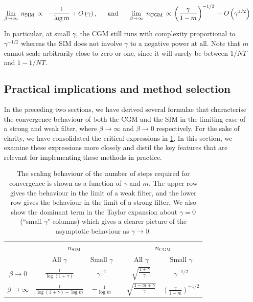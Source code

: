 \begin{equation*}
    \lim_{\beta \rightarrow \infty} \;  n_\text{SIM} \, \propto \;\;  -\frac{1}{\log m} + O\left(\gamma\right), \;\; \quad \text{and} \quad \;\; \lim_{\beta \rightarrow \infty} \;  n_\text{CGM} \, \propto \, \left(\frac{\gamma}{1 - m} \right)^{-1/2} \, + O\left(\gamma^{1/2}\right) 
\end{equation*}


In particular, at small $\gamma$, the CGM still runs with complexity proportional to $\gamma^{-1/2}$ whereas the SIM does not involve $\gamma$ to a negative power at all. Note that $m$ cannot scale arbitrarily close to zero or one, since it will surely be between $1/NT$ and $1 - 1/NT$. 


\subsection{Practical implications and method selection}

\label{sec:GSR_convergence_implications}

In the preceding two sections, we have derived several formulae that characterise the convergence behaviour of both the CGM and the SIM in the limiting case of a strong and weak filter, where $\beta \rightarrow \infty$ and $\beta \rightarrow 0$ respectively. For the sake of clarity, we have consolidated the critical expressions in \cref{tab:conv_SIM_CGM}. In this section, we examine these expressions more closely and distil the key features that are relevant for implementing these methods in practice.


\begin{table}[t]
    \centering
    \def\arraystretch{1.5}
    \begin{tabular}{@{}cccccc}
    \toprule
    & \multicolumn{2}{c}{$n_\text{SIM}$} & \phantom{abc}& \multicolumn{2}{c}{$n_\text{CGM}$} \\
    \cmidrule{2-3} \cmidrule{5-6}
                               & All $\gamma$   & Small $\gamma$   &&  All $\gamma$   & Small $\gamma$ \\ \midrule \rule{0pt}{1cm}
    $\beta \rightarrow 0$      & $ \displaystyle \frac{1}{\log(1 + \gamma)}$   & $\displaystyle \gamma^{-1}$    &&    $\displaystyle \sqrt{\frac{1 + \gamma}{\gamma}}$ & $\displaystyle \gamma^{-1/2}$    \\ \rule{0pt}{6ex}
    $\beta \rightarrow \infty$ & $\displaystyle \frac{1}{\log(1 + \gamma) - \log m}$ & $\displaystyle -\frac{1}{\log m}$    &&  $\displaystyle \sqrt{\frac{1 - m + \gamma}{\gamma}}$ & $\displaystyle \left(\frac{\gamma}{1 - m} \right)^{-1/2}$ \\[0.5cm] \bottomrule 
    \end{tabular}
    \caption{The scaling behaviour of the number of steps required for convergence is shown as a function of $\gamma$ and $m$. The upper row gives the behaviour in the limit of a weak filter, and the lower row gives the behaviour in the limit of a strong filter. We also show the dominant term in the Taylor expansion about $\gamma=0$ (``small $\gamma$" columns) which gives a clearer picture of the asymptotic behaviour as $\gamma \rightarrow 0$. }
    \label{tab:conv_SIM_CGM} 
\end{table}

